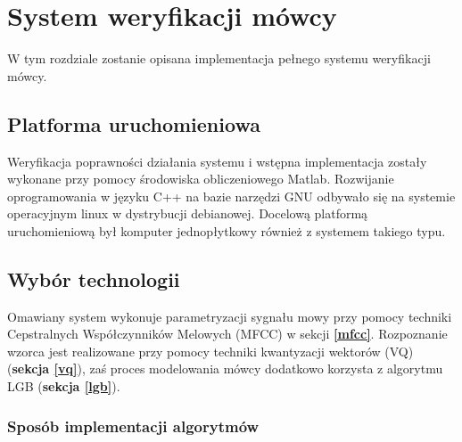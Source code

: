 \chapter{System weryfikacji mówcy}

W tym rozdziale zostanie opisana implementacja pełnego systemu weryfikacji mówcy. 

\section{Platforma uruchomieniowa}

Weryfikacja poprawności działania systemu i wstępna implementacja zostały wykonane przy pomocy środowiska obliczeniowego Matlab. Rozwijanie oprogramowania w języku C++ na bazie narzędzi GNU odbywało się na systemie operacyjnym linux w dystrybucji debianowej. Docelową platformą uruchomieniową był komputer jednopłytkowy również z systemem takiego typu.

\section{Wybór technologii}

Omawiany system wykonuje parametryzacji sygnału mowy przy pomocy techniki Cepstralnych Współczynników Melowych (MFCC) w sekcji \textbf{\ref{mfcc}}. Rozpoznanie wzorca jest realizowane przy pomocy techniki kwantyzacji wektorów (VQ) (\textbf{sekcja \ref{vq}}), zaś proces modelowania mówcy dodatkowo korzysta z algorytmu LGB (\textbf{sekcja \ref{lgb}}).

\subsection{Sposób implementacji algorytmów}

